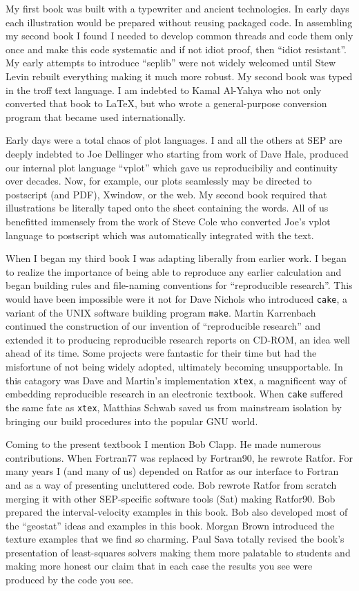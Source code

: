 My first book was built with a typewriter and ancient technologies. In
early days each illustration would be prepared without reusing
packaged code. In assembling my second book I found I needed to
develop common threads and code them only once and make this code
systematic and if not idiot proof, then ``idiot resistant''. My early
attempts to introduce ``seplib'' were not widely welcomed until Stew
Levin rebuilt everything making it much more robust.  My second book
was typed in the troff text language. I am indebted to Kamal Al-Yahya
who not only converted that book to \LaTeX, but who wrote a
general-purpose conversion program that became used internationally.

Early days were a total chaos of plot languages. I and all the others
at SEP are deeply indebted to Joe Dellinger who starting from work of
Dave Hale, produced our internal plot language ``vplot'' which gave us
reproducibiliy and continuity over decades. Now, for example, our
plots seamlessly may be directed to postscript (and PDF), Xwindow, or
the web. My second book required that illustrations be literally taped
onto the sheet containing the words.  All of us benefitted immensely
from the work of Steve Cole who converted Joe's vplot language to
postscript which was automatically integrated with the text.

When I began my third book I was adapting liberally from earlier
work. I began to realize the importance of being able to reproduce any
earlier calculation and began building rules and file-naming
conventions for ``reproducible research''. This would have been
impossible were it not for Dave Nichols who introduced \texttt{cake},
a variant of the UNIX software building program \texttt{make}. Martin
Karrenbach continued the construction of our invention of
``reproducible research'' and extended it to producing reproducible
research reports on CD-ROM, an idea well ahead of its time. Some
projects were fantastic for their time but had the misfortune of not
being widely adopted, ultimately becoming unsupportable. In this
catagory was Dave and Martin's implementation \texttt{xtex}, a
magnificent way of embedding reproducible research in an electronic
textbook. When \texttt{cake} suffered the same fate as \texttt{xtex},
Matthias Schwab saved us from mainstream isolation by bringing our
build procedures into the popular GNU world.

Coming to the present textbook I mention Bob Clapp. He made numerous
contributions.  When Fortran77 was replaced by Fortran90, he rewrote
Ratfor. For many years I (and many of us) depended on Ratfor as our
interface to Fortran and as a way of presenting uncluttered code. Bob
rewrote Ratfor from scratch merging it with other SEP-specific
software tools (Sat) making Ratfor90. Bob prepared the
interval-velocity examples in this book. Bob also developed most of
the ``geostat'' ideas and examples in this book. Morgan Brown
introduced the texture examples that we find so charming. Paul Sava
totally revised the book's presentation of least-squares solvers
making them more palatable to students and making more honest our
claim that in each case the results you see were produced by the code
you see.

